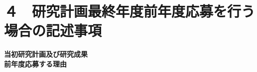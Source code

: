 \documentclass[11pt,a4paper,uplatex,dvipdfmx]{ujarticle} 		%
\newcommand{\研究課題名}{伝統的な木造土塗り壁の復元力に及ぼす軸組の影響に関する実験研究}
\newcommand{\研究機関名}{公立鳥取環境大学}
\newcommand{\研究代表者氏名}{中治弘行}
\newcommand{\私}{{\研究代表者氏名}}
\newcommand{\研究期間の最終元号年度}{8}  %
\begin{document}
\section{４　研究計画最終年度前年度応募を行う場合の記述事項}

\newcommand{\最終年度研究種目名}{\quad{}}
\newcommand{\最終年度研究課題番号}{\quad{}}
\newcommand{\最終年度研究課題名}{\quad{}}
\newcommand{\最終年度研究期間}{令和\quad{}年度〜令和\一年目 年度}


\noindent
\textbf{当初研究計画及び研究成果}\\


\noindent
\textbf{前年度応募する理由}\\




\end{document}
